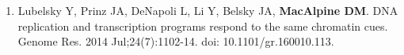 \documentclass{nihbiosketch}
\begin{document}
\begin{statement}





\begin{enumerate}



\item Lubelsky Y, Prinz JA, DeNapoli L, Li Y, Belsky JA, \textbf{MacAlpine DM}. DNA
replication and transcription programs respond to the same chromatin cues. Genome Res. 2014 Jul;24(7):1102-14. doi: 10.1101/gr.160010.113. 


\end{enumerate}
\end{statement}
\end{document}
